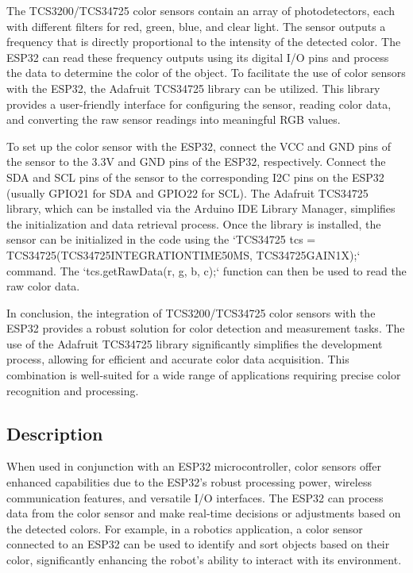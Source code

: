 The TCS3200/TCS34725 color sensors contain an array of photodetectors, each with different filters for red, green, blue, and clear light. The sensor outputs a frequency that is directly proportional to the intensity of the detected color. The ESP32 can read these frequency outputs using its digital I/O pins and process the data to determine the color of the object. To facilitate the use of color sensors with the ESP32, the Adafruit TCS34725 library can be utilized. This library provides a user-friendly interface for configuring the sensor, reading color data, and converting the raw sensor readings into meaningful RGB values.

To set up the color sensor with the ESP32, connect the VCC and GND pins of the sensor to the 3.3V and GND pins of the ESP32, respectively. Connect the SDA and SCL pins of the sensor to the corresponding I2C pins on the ESP32 (usually GPIO21 for SDA and GPIO22 for SCL). The Adafruit TCS34725 library, which can be installed via the Arduino IDE Library Manager, simplifies the initialization and data retrieval process. Once the library is installed, the sensor can be initialized in the code using the `TCS34725 tcs = TCS34725(TCS34725INTEGRATIONTIME50MS, TCS34725GAIN1X);` command. The `tcs.getRawData(r, g, b, c);` function can then be used to read the raw color data.

In conclusion, the integration of TCS3200/TCS34725 color sensors with the ESP32 provides a robust solution for color detection and measurement tasks. The use of the Adafruit TCS34725 library significantly simplifies the development process, allowing for efficient and accurate color data acquisition. This combination is well-suited for a wide range of applications requiring precise color recognition and processing.




\subsection{Description}

When used in conjunction with an ESP32 microcontroller, color sensors offer enhanced capabilities due to the ESP32's robust processing power, wireless communication features, and versatile I/O interfaces. The ESP32 can process data from the color sensor and make real-time decisions or adjustments based on the detected colors. For example, in a robotics application, a color sensor connected to an ESP32 can be used to identify and sort objects based on their color, significantly enhancing the robot's ability to interact with its environment.

